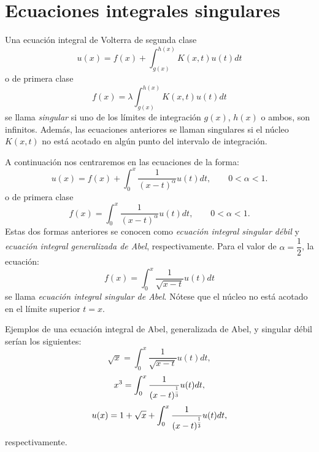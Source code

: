 \section{Ecuaciones integrales singulares}
\begin{definicion}
	Una ecuación integral de Volterra de segunda clase 
	\begin{equation}\label{}
		u(x) = f(x) + \int_{g(x)}^{h(x)} K(x,t)u(t)dt
	\end{equation}
	o de primera clase
	\begin{equation}\label{}
		f(x) = \lambda \int_{g(x)}^{h(x)} K(x,t)u(t)dt
	\end{equation}
	se llama \textit{singular} si uno de los límites de integración $g(x)$, $h(x)$ o ambos, son infinitos. Además, las ecuaciones anteriores se llaman singulares si el núcleo $K(x,t)$ no está acotado en algún punto del intervalo de integración.
\end{definicion}
A continuación nos centraremos en las ecuaciones de la forma:
\begin{equation}\label{}
	u(x) = f(x) + \int_0^x \dfrac{1}{(x-t)^\alpha}u(t)dt, \qquad 0 < \alpha < 1.
\end{equation}
o de primera clase
\begin{equation}\label{}
	f(x) = \int_0^x \dfrac{1}{(x-t)^\alpha}u(t)dt, \qquad 0 < \alpha < 1.
\end{equation}
Estas dos formas anteriores se conocen como \textit{ecuación integral singular débil} y \textit{ecuación integral generalizada de Abel}, respectivamente. Para el valor de $\alpha = \dfrac{1}{2}$, la ecuación:
\begin{equation}\label{}
	f(x) = \int_0^x \dfrac{1}{\sqrt{x-t}}u(t)dt
\end{equation}
se llama \textit{ecuación integral singular de Abel}. Nótese que el núcleo no está acotado en el límite superior $t = x$. 
\begin{ejemplo}
	Ejemplos de una ecuación integral de Abel, generalizada de Abel, y singular débil serían los siguientes:
	\begin{equation}\label{}
		\sqrt{x} = \int_0^x \dfrac{1}{\sqrt{x-t}}u(t)dt,
	\end{equation}
		\begin{equation}\label{}
		x^3 = \int_0^x \dfrac{1}{(x-t)^{\scaleto{\dfrac{1}{3}}{12pt}}}u(t)dt,
	\end{equation}
		\begin{equation}\label{}
		u(x) = 1 + \sqrt{x} + \int_0^x \dfrac{1}{(x-t)^{\scaleto{\dfrac{1}{3}}{12pt}}}u(t)dt,
	\end{equation}
	respectivamente.
\end{ejemplo}

\endinput